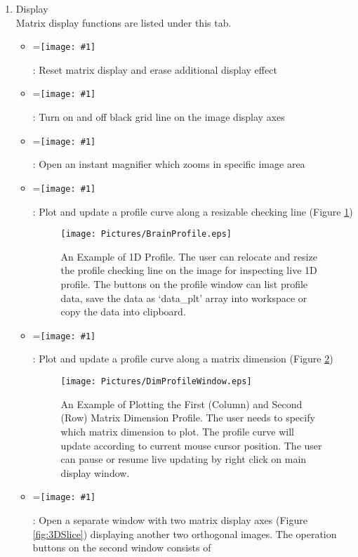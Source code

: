 \documentclass{article}%
\newcommand{\vcenteredinclude}[1]{
\begingroup
\setbox0=\hbox{\texttt{[image: \#1]}}
\parbox{\wd0}{\box0}\endgroup}
\begin{document}
	\begin{enumerate}

	\item Display \\
	
	Matrix display functions are listed under this tab. 
	
	\begin{itemize}
		\item \vcenteredinclude{Pictures/Release.eps} : Reset matrix display and erase additional display effect
		\item \vcenteredinclude{Pictures/Grid.eps} : Turn on and off black grid line on the image display axes
		\item \vcenteredinclude{Pictures/Magnifier.eps} : Open an instant magnifier which zooms in specific image area
		\item \vcenteredinclude{Pictures/LineProfile.eps} : Plot and update a profile curve along a resizable checking line (Figure \ref{fig:BrainProfile})
		
		\begin{figure}[htbp]
			\centering
				\texttt{[image: Pictures/BrainProfile.eps]}
			\caption{An Example of 1D Profile. The user can relocate and resize the profile checking line on the image for inspecting live 1D profile. The buttons on the profile window 
							 can list profile data, save the data as `data\_plt' array into workspace or copy the data into clipboard.}
			\label{fig:BrainProfile}
		\end{figure}	
		
		
		\item \vcenteredinclude{Pictures/DimProfile.eps} : Plot and update a profile curve along a matrix dimension (Figure \ref{fig:DimProfileWindow})
		
			\begin{figure}[htbp]
			\centering
				\texttt{[image: Pictures/DimProfileWindow.eps]}
			\caption{An Example of Plotting the First (Column) and Second (Row) Matrix Dimension Profile. The user needs to specify which matrix dimension to plot. The profile curve will update according to current mouse cursor position. The user can pause or resume live updating by right click on main display window.}
			\label{fig:DimProfileWindow}
		\end{figure}	
		
		\item \vcenteredinclude{Pictures/3DSlicer.eps} : Open a separate window with two matrix display axes (Figure \ref{fig:3DSlice}) displaying another two orthogonal images. The operation buttons on the second window consists of 


\end{itemize}
\end{enumerate}
\end{document}
